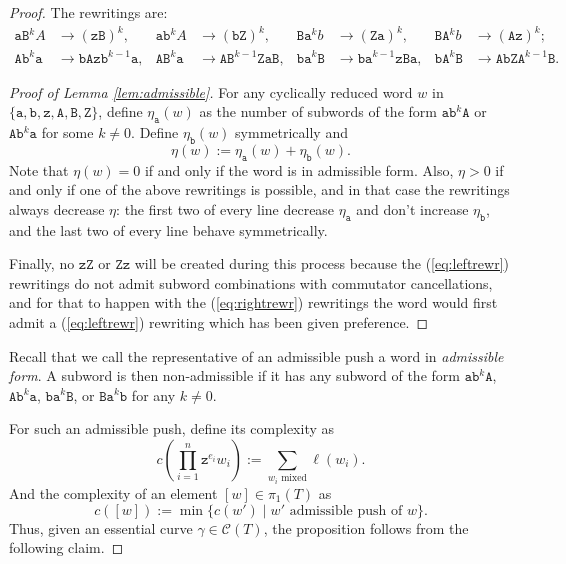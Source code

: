 \documentclass{article}
\begin{document}
\begin{proof}
        The rewritings are: 
        \begin{align}
            \mathtt{aB}^kA &\to (\mathtt{zB})^k, & \mathtt{ab}^kA &\to (\mathtt{bZ})^k, & \mathtt{Ba}^kb &\to (\mathtt{Za})^k, & \mathtt{BA}^kb &\to (\mathtt{Az})^k; \label{eq:leftrewr}\\
            \mathtt{Ab}^k\mathtt{a} &\to \mathtt{bAzb}^{k-1}\mathtt{a}, & \mathtt{AB}^k\mathtt{a} &\to \mathtt{AB}^{k-1}\mathtt{ZaB}, &\mathtt{ba}^k\mathtt{B} &\to \mathtt{ba}^{k-1}\mathtt{zBa}, &\mathtt{bA}^k\mathtt{B} &\to \mathtt{AbZA}^{k-1}\mathtt{B}.&\label{eq:rightrewr}
        \end{align}

        \begin{proof}[Proof of Lemma \ref{lem:admissible}]
        For any cyclically reduced word $w$ in $\{\mathtt{a,b,z,A,B,Z}\}$, define $\eta_\mathtt{a}(w)$ as the number of subwords of the form $\mathtt{ab}^k\mathtt{A}$ or $\mathtt{Ab}^k\mathtt{a}$ for some $k\neq0$. Define $\eta_\mathtt{b}(w)$ symmetrically and \[\eta(w):=\eta_\mathtt{a}(w)+\eta_\mathtt{b}(w).\]
        Note that $\eta(w)=0$ if and only if the word is in admissible form. Also, $\eta>0$ if and only if one of the above rewritings is possible, and in that case the rewritings always decrease $\eta$: the first two of every line decrease $\eta_\mathtt{a}$ and don't increase $\eta_\mathtt{b}$, and the last two of every line behave symmetrically.

        Finally, no $\mathtt{zZ}$ or $\mathtt{Zz}$ will be created during this process because the (\ref{eq:leftrewr}) rewritings do not admit subword combinations with commutator cancellations, and for that to happen with the (\ref{eq:rightrewr}) rewritings the word would first admit a (\ref{eq:leftrewr}) rewriting which has been given preference.
            
        \end{proof}
        
        Recall that we call the representative of an admissible push a word in \emph{admissible form}. A subword is then non-admissible if it has any subword of the form $\mathtt{ab}^k\mathtt{A}$, $\mathtt{Ab}^k\mathtt{a}$, $\mathtt{ba}^k\mathtt{B}$, or $\mathtt{Ba}^k\mathtt{b}$  for any $k\neq0$.
		
		For such an admissible push, define its complexity as 
		\[
		c\left(\prod_{i=1}^n \mathtt{z}^{e_i}w_i\right):=\sum_{w_i\text{ mixed}}\ell(w_i).
		\]
		And the complexity of an element $[w]\in\pi_1(T)$ as 
		\[
		c([w]):=\min\{c(w')\mid w'\text{ admissible push of }w\}.
		\]
		Thus, given an essential curve $\gamma\in\mathcal{C}(T)$, the proposition follows from the following claim.
		

\end{proof}
\end{document}
